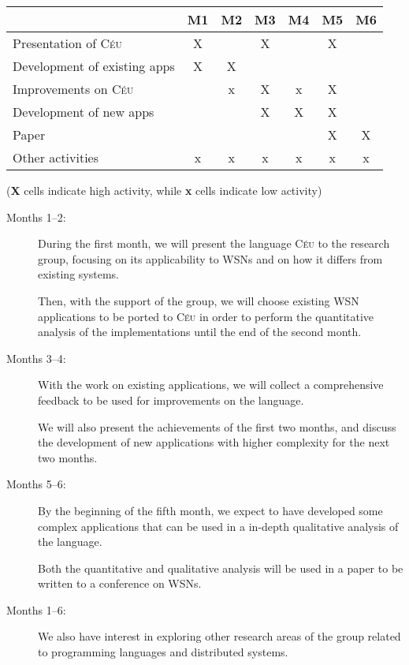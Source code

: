 \documentclass[pdftex,12pt,a4paper]{article}
\newcommand{\CEU}{\textsc{C\'{e}u}}
\begin{document}
\begin{table}[h]
\begin{center}
\begin{tabular}{ | l | c | c | c | c | c | c | }
\hline
    & M1 & M2 & M3 & M4 & M5 & M6 \\ \hline

Presentation of \CEU{}       & X &   & X &   & X &   \\ \hline
Development of existing apps & X & X &   &   &   &   \\ \hline
Improvements on \CEU{}       &   & x & X & x & X &   \\ \hline
Development of new apps      &   &   & X & X & X &   \\ \hline
Paper                        &   &   &   &   & X & X \\ \hline
Other activities             & x & x & x & x & x & x \\ \hline
\end{tabular}
\linebreak
{\small(\textbf{X} cells indicate high activity, while \textbf{x} cells 
indicate low activity)}
\end{center}
\end{table}

\begin{description}

\item[Months 1--2:]

During the first month, we will present the language \CEU{} to the research 
group, focusing on its applicability to WSNs and
on how it differs from existing systems.

Then, with the support of the group, we will choose existing WSN applications 
to be ported to \CEU{} in order to perform the
quantitative analysis of the implementations until the end of the second month.

\item[Months 3--4:]

With the work on existing applications, we will collect a comprehensive 
feedback to be used for improvements on the
language.

We will also present the achievements of the first two months, and discuss the 
development of new applications with
higher complexity for the next two months.

\item[Months 5--6:]

By the beginning of the fifth month, we expect to have developed some complex 
applications that can be used in a in-depth
qualitative analysis of the language.

Both the quantitative and qualitative analysis will be used in a paper to be 
written to a conference on WSNs.

\item[Months 1--6:]

We also have interest in exploring other research areas of the group related to 
programming languages and distributed
systems.

\end{description}
\end{document}
